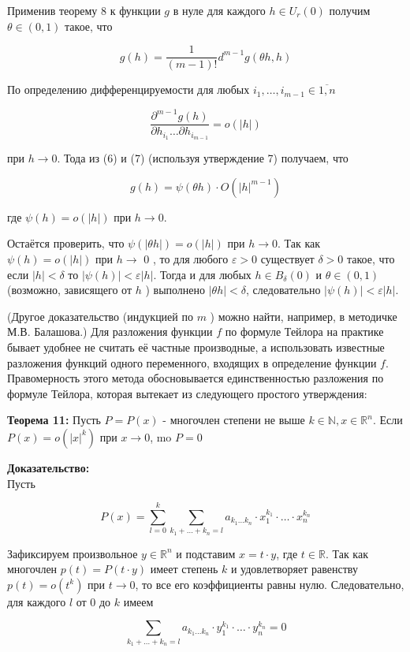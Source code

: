 \documentclass[a4paper,12pt]{article} %
\begin{document}
Применив теорему 8 к функции $g$ в нуле для каждого $h \in U_{r}(0)$ получим $\theta \in(0,1)$ такое, что

$$
g(h)=\frac{1}{(m-1) !} d^{m-1} g(\theta h, h)
$$

По определению дифференцируемости для любых $i_{1}, \ldots, i_{m-1} \in \overline{1, n}$

$$
\frac{\partial^{m-1} g(h)}{\partial h_{i_{1}} \ldots \partial h_{i_{m-1}}}=o(|h|)
$$

при $h \rightarrow 0$. Тода из (6) и (7) (используя утверждение 7) получаем, что

$$
g(h)=\psi(\theta h) \cdot O\left(|h|^{m-1}\right)
$$

где $\psi(h)=o(|h|)$ при $h \rightarrow 0$.

Остаётся проверить, что $\psi(|\theta h|)=o(|h|)$ при $h \rightarrow 0$. Так как $\psi(h)=o(|h|)$ при $h \rightarrow$ 0 , то для любого $\varepsilon>0$ существует $\delta>0$ такое, что если $|h|<\delta$ то $|\psi(h)|<\varepsilon|h|$. Тогда и для любых $h \in B_{\delta}(0)$ и $\theta \in(0,1)$ (возможно, зависящего от $h$ ) выполнено $|\theta h|<\delta$, следовательно $|\psi(h)|<\varepsilon|h|$.

(Другое доказательство (индукцией по $m$ ) можно найти, например, в методичке М.В. Балашова.) Для разложения функции $f$ по формуле Тейлора на практике бывает удобнее не считать её частные производные, а использовать известные разложения функций одного переменного, входящих в определение функции $f$. Правомерность этого метода обосновывается единственностью разложения по формуле Тейлора, которая вытекает из следующего простого утверждения:

\textbf{Теорема 11:} Пусть $P=P(x)$ - многочлен степени не выше $k \in \mathbb{N}, x \in \mathbb{R}^{n}$. Если $P(x)=o\left(|x|^{k}\right)$ при $x \rightarrow 0$, mo $P=0$

\textbf{Доказательство:}\\
Пусть

$$
P(x)=\sum_{l=0}^{k} \sum_{k_{1}+\ldots+k_{n}=l} a_{k_{1} \ldots k_{n}} \cdot x_{1}^{k_{1}} \cdot \ldots \cdot x_{n}^{k_{n}}
$$

Зафиксируем произвольное $y \in \mathbb{R}^{n}$ и подставим $x=t \cdot y$, где $t \in \mathbb{R}$. Так как многочлен $p(t)=P(t \cdot y)$ имеет степень $k$ и удовлетворяет равенству $p(t)=o\left(t^{k}\right)$ при $t \rightarrow 0$, то все его коэффициенты равны нулю. Следовательно, для каждого $l$ от 0 до $k$ имеем

$$
\sum_{k_{1}+\ldots+k_{n}=l} a_{k_{1} \ldots k_{n}} \cdot y_{1}^{k_{1}} \cdot \ldots \cdot y_{n}^{k_{n}}=0
$$
\end{document}
